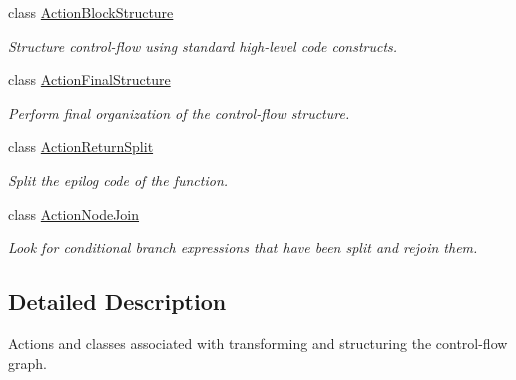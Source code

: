 \begin{DoxyCompactItemize}
class \mbox{\hyperlink{class_action_block_structure}{Action\+Block\+Structure}}
\begin{DoxyCompactList}\small\item\em Structure control-\/flow using standard high-\/level code constructs. \end{DoxyCompactList}\item 
class \mbox{\hyperlink{class_action_final_structure}{Action\+Final\+Structure}}
\begin{DoxyCompactList}\small\item\em Perform final organization of the control-\/flow structure. \end{DoxyCompactList}\item 
class \mbox{\hyperlink{class_action_return_split}{Action\+Return\+Split}}
\begin{DoxyCompactList}\small\item\em Split the epilog code of the function. \end{DoxyCompactList}\item 
class \mbox{\hyperlink{class_action_node_join}{Action\+Node\+Join}}
\begin{DoxyCompactList}\small\item\em Look for conditional branch expressions that have been split and rejoin them. \end{DoxyCompactList}\end{DoxyCompactItemize}


\subsection{Detailed Description}
Actions and classes associated with transforming and structuring the control-\/flow graph. 

